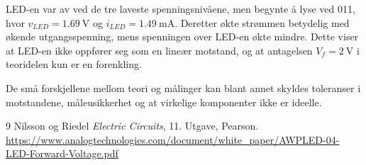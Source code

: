 \documentclass[11pt,a4paper,twocolumn]{article}
\begin{document}
LED-en var av ved de tre laveste spenningsnivåene, men begynte å lyse
ved 011, hvor $v_{LED}=\qty{1.69}{\volt}$ og
$i_{LED}=\qty{1.49}{\milli\ampere}$. Deretter økte strømmen betydelig
med økende utgangsspenning, mens spenningen over LED-en økte mindre.
Dette viser at LED-en ikke oppfører seg som en lineær motstand, og at
antagelsen $V_f=\qty{2}{\volt}$ i teoridelen kun er en forenkling.

De små forskjellene mellom teori og målinger kan blant annet skyldes
toleranser i motstandene, måleusikkerhet og at virkelige komponenter
ikke er ideelle.

\begin{thebibliography}{9}
Nilsson og Riedel \textit{Electric Circuits}, 11. Utgave, Pearson.
\url{https://www.analogtechnologies.com/document/white_paper/AWPLED-04-LED-Forward-Voltage.pdf}
\end{thebibliography}
\end{document}

